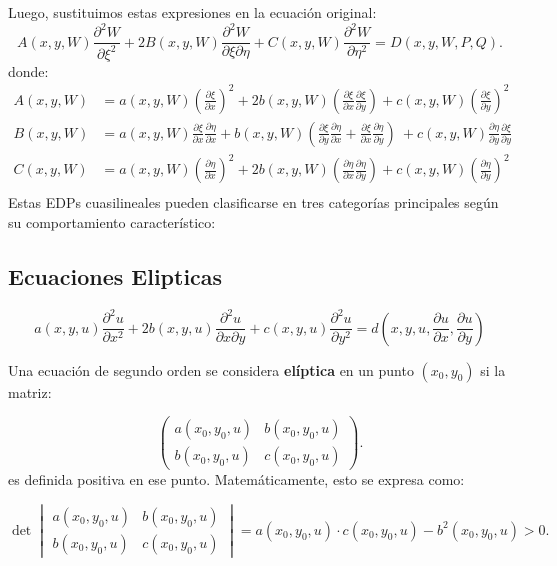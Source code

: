\documentclass[11pt]{book}
\theoremstyle{plain}
\theoremstyle{definition}
\begin{document}
Luego, sustituimos estas expresiones en la ecuación original:
\[
A(x, y, W) \frac{\partial^2 W}{\partial \xi^2} + 2B(x, y, W) \frac{\partial^2 W}{\partial \xi \partial \eta} + C(x, y, W) \frac{\partial^2 W}{\partial \eta^2} = D(x, y, W, P, Q)
.\]
donde:
\begin{align*}
A(x, y, W) &= a(x, y, W) \left(\frac{\partial \xi}{\partial x} \right)^2 + 2b(x, y, W) \left(\frac{\partial \xi}{\partial x} \frac{\partial \xi}{\partial y}\right) + c(x, y, W) \left(\frac{\partial \xi}{\partial y} \right)^2 \\
B(x, y, W) &= a(x, y, W) \frac{\partial \xi}{\partial x} \frac{\partial \eta}{\partial x} + b(x, y, W)\left(\frac{\partial \xi}{\partial y}  \frac{\partial \eta}{\partial x} + \frac{\partial \xi}{\partial x}  \frac{\partial \eta}{\partial y} \right) \ + c(x, y, W) \frac{\partial \eta}{\partial y} \frac{\partial \xi}{\partial y}\\
C(x, y, W) &= a(x, y, W) \left(\frac{\partial \eta}{\partial x} \right)^2 + 2b(x, y, W) \left(\frac{\partial \eta}{\partial x} \frac{\partial \eta}{\partial y}\right) + c(x, y, W) \left(\frac{\partial \eta}{\partial y} \right)^2 \\
\end{align*}
Estas EDPs cuasilineales pueden clasificarse en tres categorías principales según su comportamiento característico:

\subsection{Ecuaciones Elipticas}

\setcounter{equation}{0}
\begin{equation}
a(x, y, u) \frac{\partial^2 u}{\partial x^2} + 2b(x, y, u) \frac{\partial^2 u}{\partial x \partial y} + c(x, y, u) \frac{\partial^2 u}{\partial y^2} = d(x, y, u, \frac{\partial u}{\partial x}, \frac{\partial u}{\partial y})
\end{equation}

Una ecuación de segundo orden se considera \textbf{elíptica} en un punto $(x_0, y_0)$ si la matriz:

\[
\begin{pmatrix}
a(x_0, y_0, u) & b(x_0, y_0, u) \\
b(x_0, y_0, u) & c(x_0, y_0, u)
\end{pmatrix}
.\]
es definida positiva en ese punto. Matemáticamente, esto se expresa como:

\[
\det
\begin{vmatrix}
a(x_0, y_0, u) & b(x_0, y_0, u) \\
b(x_0, y_0, u) & c(x_0, y_0, u)
\end{vmatrix}
= a(x_0, y_0, u) \cdot c(x_0, y_0, u) - b^2(x_0, y_0, u) > 0
.\]
\end{document}
